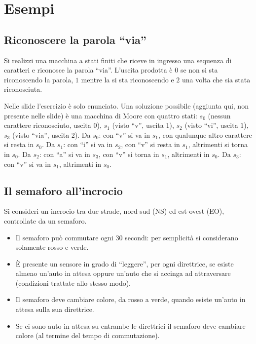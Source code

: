 \documentclass[11pt,a4paper]{article}
\begin{document}
\section{Esempi}

\subsection{Riconoscere la parola ``via''}

\begin{esercizio}
Si realizzi una macchina a stati finiti che riceve in ingresso una sequenza di caratteri e riconosce la parola ``via''. L'uscita prodotta è $0$ se non si sta riconoscendo la parola, $1$ mentre la si sta riconoscendo e $2$ una volta che sia stata riconosciuta.
\end{esercizio}

\begin{osservazione}
Nelle slide l'esercizio è solo enunciato. Una soluzione possibile (aggiunta qui, non presente nelle slide) è una macchina di Moore con quattro stati: $s_0$ (nessun carattere riconosciuto, uscita $0$), $s_1$ (visto ``v'', uscita $1$), $s_2$ (visto ``vi'', uscita $1$), $s_3$ (visto ``via'', uscita $2$). Da $s_0$: con ``v'' si va in $s_1$, con qualunque altro carattere si resta in $s_0$. Da $s_1$: con ``i'' si va in $s_2$, con ``v'' si resta in $s_1$, altrimenti si torna in $s_0$. Da $s_2$: con ``a'' si va in $s_3$, con ``v'' si torna in $s_1$, altrimenti in $s_0$. Da $s_3$: con ``v'' si va in $s_1$, altrimenti in $s_0$.
\end{osservazione}

\subsection{Il semaforo all'incrocio}

Si consideri un incrocio tra due strade, nord-sud (NS) ed est-ovest (EO), controllate da un semaforo.
\begin{itemize}
    \item Il semaforo può commutare ogni $30$ secondi: per semplicità si considerano solamente rosso e verde.
    \item È presente un sensore in grado di ``leggere'', per ogni direttrice, se esiste almeno un'auto in attesa oppure un'auto che si accinga ad attraversare (condizioni trattate allo stesso modo).
    \item Il semaforo deve cambiare colore, da rosso a verde, quando esiste un'auto in attesa sulla sua direttrice.
    \item Se ci sono auto in attesa su entrambe le direttrici il semaforo deve cambiare colore (al termine del tempo di commutazione).
\end{itemize}
\end{document}
